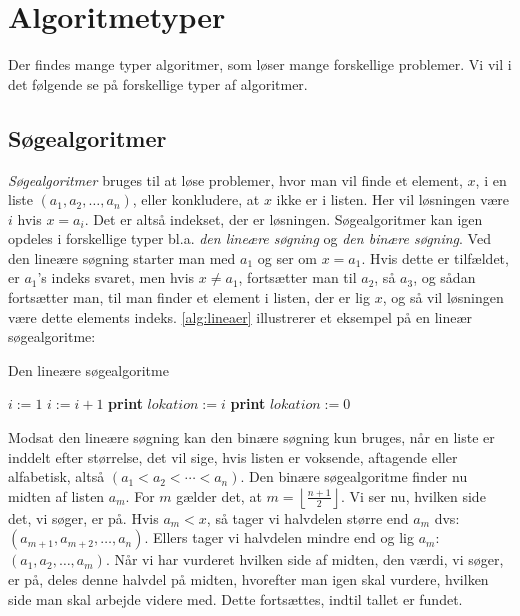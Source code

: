 \section{Algoritmetyper}
Der findes mange typer algoritmer, som løser mange forskellige problemer. Vi vil i det følgende se på forskellige typer af algoritmer.
\subsection{Søgealgoritmer}
\emph{Søgealgoritmer} bruges til at løse problemer, hvor man vil finde et element, $x$, i en liste $(a_{1}, a_{2}, \dotsc, a_{n})$, eller konkludere, at $x$ ikke er i listen. Her vil løsningen være $i$ hvis $x=a_{i}$. Det er altså indekset, der er løsningen. Søgealgoritmer kan igen opdeles i forskellige typer bl.a. \emph{den lineære søgning} og \emph{den binære søgning}. Ved den lineære søgning starter man med $a_1$ og ser om $x=a_{1}$. Hvis dette er tilfældet, er $a_{1}$'s indeks svaret, men hvis $x \neq a_{1}$, fortsætter man til $a_{2}$, så $a_{3}$, og sådan fortsætter man, til man finder et element i listen, der er lig $x$, og så vil løsningen være dette elements indeks. \autoref{alg:lineaer} illustrerer et eksempel på en lineær søgealgoritme:

\begin{algorithm}[H] 
\caption{Den lineære søgealgoritme}
\begin{algorithmic}[1]

    \State $i:=1$
        \State $i:=i+1$
    \State \textbf{print} $lokation:=i$
    \Else
    \State \textbf{print} $lokation:=0$
    \EndIf
    \EndWhile  \label{roy's loop}
\EndProcedure

\end{algorithmic}
\label{alg:lineaer}
\end{algorithm}


Modsat den lineære søgning kan den binære søgning kun bruges, når en liste er inddelt efter størrelse, det vil sige, hvis listen er voksende, aftagende eller alfabetisk, altså $(a_{1}<a_{2}<\dotsb<a_{n})$. Den binære søgealgoritme finder nu midten af listen $a_{m}$. For $m$ gælder det, at $m=\left \lfloor \frac{n+1}{2} \right \rfloor$. Vi ser nu, hvilken side det, vi søger, er på. Hvis $a_{m}<x$, så tager vi halvdelen større end $a_{m}$ dvs: $(a_{m+1}, a_{m+2},\dotsc,a_{n})$. Ellers tager vi halvdelen mindre end og lig $a_{m}$: $(a_{1}, a_{2},\dotsc,a_{m})$. Når vi har vurderet hvilken side af midten, den værdi, vi søger, er på, deles denne halvdel på midten, hvorefter man igen skal vurdere, hvilken side man skal arbejde videre med. Dette fortsættes, indtil tallet er fundet. 

